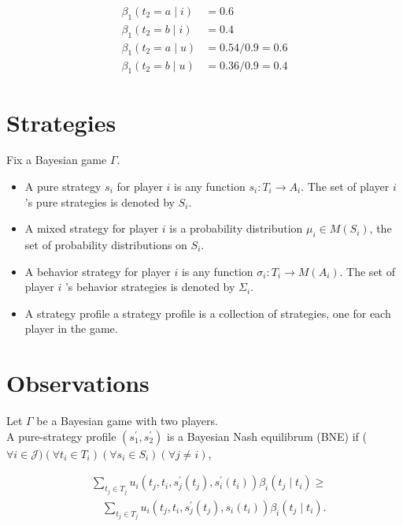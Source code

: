 \documentclass[10pt]{article}
\begin{document}
$$
\begin{aligned}
\beta_{1}\left(t_{2}=a \mid i\right) & =0.6 \\
\beta_{1}\left(t_{2}=b \mid i\right) & =0.4 \\
\beta_{1}\left(t_{2}=a \mid u\right) & =0.54 / 0.9=0.6 \\
\beta_{1}\left(t_{2}=b \mid u\right) & =0.36 / 0.9=0.4
\end{aligned}
$$

\section*{Strategies}
Fix a Bayesian game $\Gamma$.

\begin{itemize}
  \item A pure strategy $s_{i}$ for player $i$ is any function $s_{i}: T_{i} \rightarrow A_{i}$. The set of player $i$ 's pure strategies is denoted by $S_{i}$.
  \item A mixed strategy for player $i$ is a probability distribution $\mu_{i} \in M\left(S_{i}\right)$, the set of probability distributions on $S_{i}$.
  \item A behavior strategy for player $i$ is any function $\sigma_{i}: T_{i} \rightarrow M\left(A_{i}\right)$. The set of player $i$ 's behavior strategies is denoted by $\Sigma_{i}$.
  \item A strategy profile a strategy profile is a collection of strategies, one for each player in the game.
\end{itemize}

\section*{Observations}
Let $\Gamma$ be a Bayesian game with two players.\\
A pure-strategy profile $\left(s_{1}^{\prime}, s_{2}^{\prime}\right)$ is a Bayesian Nash equilibrum (BNE) if ( $\forall i \in \mathcal{J})\left(\forall t_{i} \in T_{i}\right)\left(\forall s_{i} \in S_{i}\right)(\forall j \neq i)$,


\begin{align*}
& \sum_{t_{j} \in T_{j}} u_{i}\left(t_{j}, t_{i}, s_{j}^{\prime}\left(t_{j}\right), s_{i}^{\prime}\left(t_{i}\right)\right) \beta_{i}\left(t_{j} \mid t_{i}\right) \geq \\
& \quad \sum_{t_{j} \in T_{j}} u_{i}\left(t_{j}, t_{i}, s_{j}^{\prime}\left(t_{j}\right), s_{i}\left(t_{i}\right)\right) \beta_{i}\left(t_{j} \mid t_{i}\right) . \tag{1}
\end{align*}
\end{document}
